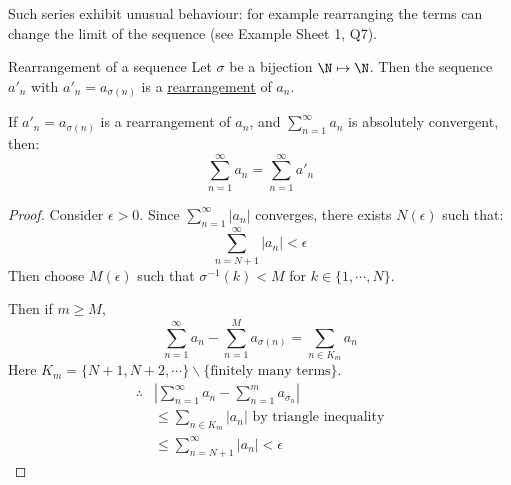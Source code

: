 \documentclass[../Main.tex]{subfiles}
\begin{document}
Such series exhibit unusual behaviour: for example rearranging the terms can change the limit of the sequence (see Example Sheet 1, Q7).
\begin{definition}{Rearrangement of a sequence}
    Let $\sigma$ be a bijection $\N \mapsto \N$. Then the sequence $a'_n$ with $a'_n = a_{\sigma(n)}$ is a \underline{rearrangement} of $a_n$.
\end{definition}
\begin{theorem}
    If $a'_n = a_{\sigma(n)}$ is a rearrangement of $a_n$, and $\sum_{n=1}^\infty a_n$ is absolutely convergent, then:
    \begin{equation*}
        \sum_{n=1}^\infty a_n = \sum_{n=1}^\infty a'_n
    \end{equation*}
\end{theorem}
\begin{proof}
    Consider $\epsilon > 0$. Since $\sum_{n=1}^\infty |a_n|$ converges, there exists $N(\epsilon)$ such that:
    \begin{equation*}
        \sum_{n=N+1}^\infty |a_n| < \epsilon
    \end{equation*}
    Then choose $M(\epsilon)$ such that $\sigma^{-1}(k) < M$ for $k \in \{1, \cdots, N\}$.\par
    Then if $m \geq M$,
    \begin{equation*}
        \sum_{n=1}^\infty a_n - \sum_{n=1}^M a_{\sigma(n)} = \sum_{n \in K_m} a_n
    \end{equation*}
    Here $K_m = \{N+1, N+2, \cdots\} \backslash \{\text{finitely many terms}\}$.
    \begin{align*}
        \therefore& \left|\sum_{n=1}^\infty a_n - \sum_{n=1}^m a_{\sigma_n}\right| \\
        &\leq \sum_{n \in K_m} |a_n| \text{ by triangle inequality} \\
        &\leq \sum_{n=N+1}^\infty |a_n| < \epsilon
    \end{align*}
\end{proof}
\end{document}
